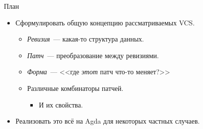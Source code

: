 \begin{frame}{План}
  \begin{itemize}
  \item Сформулировать общую концепцию рассматриваемых VCS.
    \begin{itemize}
    \item \emph{Ревизия}~--- какая-то структура данных.
    \item \emph{Патч}~--- преобразование между ревизиями.
    \item \emph{Форма}~--- <<где \emph{этот} патч что-то меняет?>>
    \item Различные комбинаторы патчей.
      \begin{itemize}
      \item И их свойства.
      \end{itemize}
    \end{itemize}
  \item Реализовать это всё на Agda для некоторых частных случаев.
  \end{itemize}
\end{frame}
